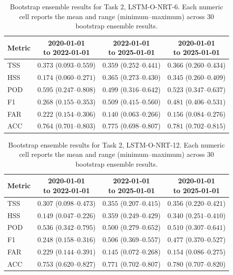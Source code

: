 \begin{table}[htbp]
\centering
\small
\caption{Bootstrap ensemble results for Task 2, LSTM-O-NRT-6. Each numeric cell reports the mean and range (minimum--maximum) across 30 bootstrap ensemble results.}
\label{tab:app-task2-lstm-o-nrt-6}
\begin{tabular}{lccc}
\toprule
Metric & \shortstack{2020-01-01\\to 2022-01-01} & \shortstack{2022-01-01\\to 2025-01-01} & \shortstack{2020-01-01\\to 2025-01-01} \\
\midrule
TSS & $0.373$ ($0.093$--$0.559$) & $0.359$ ($0.252$--$0.441$) & $0.366$ ($0.260$--$0.434$) \\
HSS & $0.174$ ($0.060$--$0.271$) & $0.365$ ($0.273$--$0.430$) & $0.345$ ($0.260$--$0.409$) \\
POD & $0.595$ ($0.247$--$0.808$) & $0.499$ ($0.316$--$0.642$) & $0.523$ ($0.347$--$0.637$) \\
F1 & $0.268$ ($0.155$--$0.353$) & $0.509$ ($0.415$--$0.560$) & $0.481$ ($0.406$--$0.531$) \\
FAR & $0.222$ ($0.154$--$0.306$) & $0.140$ ($0.063$--$0.266$) & $0.156$ ($0.084$--$0.276$) \\
ACC & $0.764$ ($0.701$--$0.803$) & $0.775$ ($0.698$--$0.807$) & $0.781$ ($0.702$--$0.815$) \\
\bottomrule
\end{tabular}
\end{table}
\clearpage

\begin{table}[htbp]
\centering
\small
\caption{Bootstrap ensemble results for Task 2, LSTM-O-NRT-12. Each numeric cell reports the mean and range (minimum--maximum) across 30 bootstrap ensemble results.}
\label{tab:app-task2-lstm-o-nrt-12}
\begin{tabular}{lccc}
\toprule
Metric & \shortstack{2020-01-01\\to 2022-01-01} & \shortstack{2022-01-01\\to 2025-01-01} & \shortstack{2020-01-01\\to 2025-01-01} \\
\midrule
TSS & $0.307$ ($0.098$--$0.473$) & $0.355$ ($0.207$--$0.415$) & $0.356$ ($0.220$--$0.421$) \\
HSS & $0.149$ ($0.047$--$0.226$) & $0.359$ ($0.249$--$0.429$) & $0.340$ ($0.251$--$0.410$) \\
POD & $0.536$ ($0.342$--$0.795$) & $0.500$ ($0.279$--$0.652$) & $0.510$ ($0.307$--$0.641$) \\
F1 & $0.248$ ($0.158$--$0.316$) & $0.506$ ($0.369$--$0.557$) & $0.477$ ($0.370$--$0.527$) \\
FAR & $0.229$ ($0.144$--$0.391$) & $0.145$ ($0.072$--$0.268$) & $0.154$ ($0.086$--$0.275$) \\
ACC & $0.753$ ($0.620$--$0.827$) & $0.771$ ($0.702$--$0.807$) & $0.780$ ($0.707$--$0.820$) \\
\bottomrule
\end{tabular}
\end{table}
\clearpage

